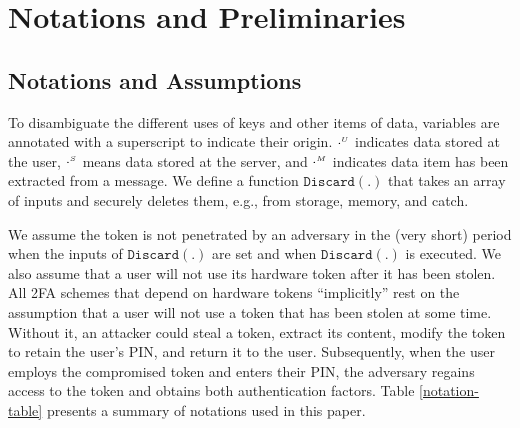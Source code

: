 

\section{Notations and Preliminaries}
 \subsection{Notations and Assumptions}
  
 To disambiguate the different uses of keys and other items of data, variables are annotated with a superscript to indicate their origin. $\cdot^{\scriptscriptstyle U}$ indicates data stored at the user, $\cdot^{\scriptscriptstyle S}$ means data stored at the server, and $\cdot^{\scriptscriptstyle M}$ indicates data item has been extracted from a message. We define a function $\mathtt{Discard}(.)$ that takes an array of inputs and securely deletes them, e.g., from storage, memory, and catch. 
 
 We assume the token is not penetrated by an adversary in the (very short) period when the inputs of $\mathtt{Discard}(.)$ are set and when  $\mathtt{Discard}(.)$ is executed. %
  We also assume that a user will not use its hardware token after it has been stolen. All 2FA schemes that depend on hardware tokens ``implicitly'' rest on the assumption that a user will not use a token that has been stolen at some time. Without it, an attacker could steal a token, extract its content, modify the token to retain the user's PIN, and return it to the user. Subsequently, when the user employs the compromised token and enters their PIN, the adversary regains access to the token and obtains both authentication factors. Table \ref{notation-table} presents a summary of notations used in this paper. 
 

 
 
% 
% 
% 
% 
% 
% 
% 
% 
% 
 
